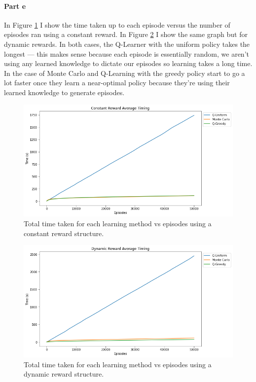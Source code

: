 \documentclass[12pt]{article}
\begin{document}
\paragraph{Part e}

In Figure \ref{fig:crts} I show the time taken up to each episode versus the number of episodes ran using a constant reward. In Figure \ref{fig:drts} I show the same graph but for dynamic rewards. In both cases, the Q-Learner with the uniform policy takes the longest --- this makes sense because each episode is essentially random, we aren't using any learned knowledge to dictate our episodes so learning takes a long time. In the case of Monte Carlo and Q-Learning with the greedy policy start to go a lot faster once they learn a near-optimal policy because they're using their learned knowledge to generate episodes.

\begin{figure}
  \includegraphics[width=0.95\linewidth]{Figures/constant-reward-timing.png}
  \centering
  \caption{Total time taken for each learning method vs episodes using a constant reward structure.}
  \label{fig:crts}
\end{figure}

\begin{figure}
  \includegraphics[width=0.95\linewidth]{Figures/dynamic-reward-timing.png}
  \centering
  \caption{Total time taken for each learning method vs episodes using a dynamic reward structure.}
  \label{fig:drts}
\end{figure}
\end{document}

